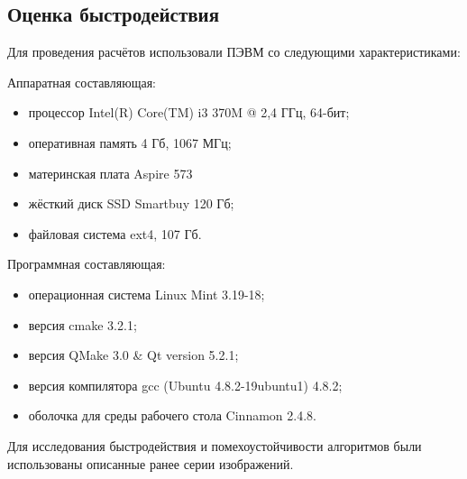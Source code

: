\subsection {Оценка быстродействия}
Для проведения расчётов использовали ПЭВМ со следующими характеристиками:

Аппаратная составляющая:
\begin{itemize}
\item процессор Intel(R) Core(TM) i3 370M @ 2,4 ГГц, 64-бит;
\item оперативная память 4 Гб, 1067 МГц;
\item материнская плата Aspire 573
\item жёсткий диск SSD Smartbuy 120 Гб;
\item файловая система ext4, 107 Гб.
\end{itemize}
Программная составляющая:
\begin{itemize}
\item операционная система Linux Mint 3.19-18;
\item версия cmake 3.2.1;
\item версия QMake 3.0 \& Qt version 5.2.1;
\item версия компилятора gcc (Ubuntu 4.8.2-19ubuntu1) 4.8.2;
\item оболочка для среды рабочего стола Cinnamon 2.4.8.
\end{itemize}

Для исследования быстродействия и помехоустойчивости алгоритмов были использованы описанные ранее серии изображений.